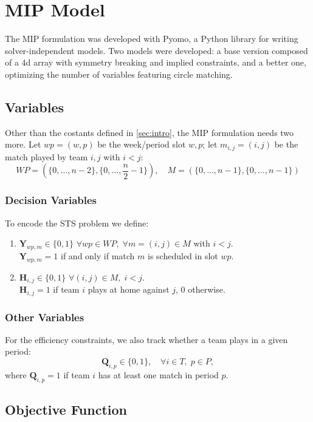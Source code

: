 
\section{MIP Model}
The MIP formulation was developed with Pyomo, a Python library for writing solver-independent models.
Two models were developed: a base version composed of a 4d array with symmetry breaking and implied constraints, and a better one, optimizing the number of variables featuring circle matching.

\subsection{Variables}
Other than the costants defined in \ref{sec:intro}, the MIP formulation needs two more.
Let $wp = (w,p)$ be the week/period slot $w,p$;
let $m_{i,j} = (i,j)$ be the match played by team $i,j$ with $i<j$:
\[
WP = (\{0, \dots, n-2\},\{0, \dots, \frac{n}{2} - 1\}), \quad M = (\{0, \dots, n-1\},\{0, \dots, n-1\})
\]

\subsubsection*{Decision Variables}
To encode the STS problem we define:
\begin{enumerate}
    \item $\mathbf{Y}_{wp,m} \in \{0,1\}$ \quad $\forall wp \in WP, \; \forall m=(i,j) \in M$ with $i<j$. \\
    $\mathbf{Y}_{wp,m} = 1$ if and only if match $m$ is scheduled in slot $wp$.
    \item $\mathbf{H}_{i,j} \in \{0,1\}$ \quad $\forall (i,j) \in M, \; i<j$. \\
    $\mathbf{H}_{i,j} = 1$ if team $i$ plays at home against $j$, $0$ otherwise.
\end{enumerate}

\subsubsection*{Other Variables}
For the efficiency constraints, we also track whether a team plays in a given period:
\[
\mathbf{Q}_{i,p} \in \{0,1\}, \quad \forall i \in T, \; p \in P,
\]
where $\mathbf{Q}_{i,p} = 1$ if team $i$ has at least one match in period $p$.

\subsection{Objective Function}
